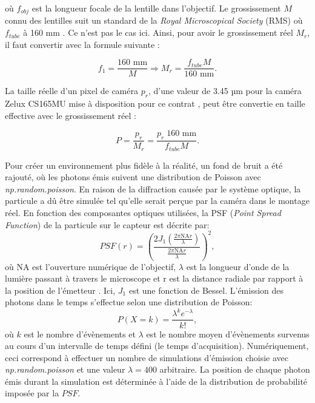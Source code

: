 \documentclass[conference]{IEEEtran}
\begin{document}
où $f_{obj}$ est la longueur focale de la lentille dans l'objectif. Le grossissement $M$ connu des lentilles suit
un standard de la \textit{Royal Microscopical Society} (RMS) où $f_{tube}$ à 160 mm
\cite{RMS}. Ce n'est pas le cas ici. Ainsi, pour avoir le grossissement réel $M_{r}$, il faut convertir avec la 
formule suivante :


\begin{equation}\label{m_2}
  f_{1}= \frac{160 \text{ mm} }{M} \Rightarrow M_{r} = \frac{f_{tube}M}{160 \text{ mm} }.
\end{equation}

La taille réelle d'un pixel de caméra $p_r$, d'une valeur de 3.45 µm pour la caméra Zelux CS165MU
mise à disposition pour ce contrat \cite{thorlabs}, peut être convertie en taille effective
avec le grossissement réel :

\begin{equation}\label{pixel}
  P = \frac{p_{r}}{M_{r}} = \frac{p_{r}\;160 \text{ mm}}{f_{tube}M}.
\end{equation}

Pour créer un environnement plus fidèle à la réalité, un fond de bruit
a été rajouté, où les photons émis suivent une distribution de Poisson avec \textit{np.random.poisson}. En raison de la diffraction 
causée par le système optique, la particule a dû être simulée
tel qu'elle serait perçue par la caméra dans le montage réel. En fonction des composantes optiques utilisées,
la PSF (\textit{Point Spread Function}) de la particule sur le capteur est décrite par:
\begin{equation}
  PSF(r)=\left(\frac{2J_1(\frac{2\pi \text{NA}r}{\lambda})}{\frac{2\pi \text{NA}r}{\lambda}}\right)^2,
\end{equation}
où NA est l'ouverture numérique de l'objectif, $\lambda$ est la longueur d'onde de la lumière passant à travers
le microscope et r est la distance radiale par rapport à la position de l'émetteur \cite{procedurier}. Ici, $J_1$
est une fonction de Bessel. L'émission des photons dans le temps s'effectue selon une distribution de Poisson:
\begin{equation}
  P(X=k)=\frac{\lambda^k e^{-\lambda}}{k!},
\end{equation}
où $k$ est le nombre d'évènements et $\lambda$ est le nombre moyen d'évènements
survenus au cours d'un intervalle de temps défini (le temps d'acquisition). Numériquement, ceci correspond à effectuer un nombre de simulations
d'émission choisie avec \textit{np.random.poisson} et une valeur $\lambda=400$ arbitraire. La position de chaque photon
émis durant la simulation est déterminée à l'aide de la distribution de probabilité imposée par la $PSF$.
\end{document}
